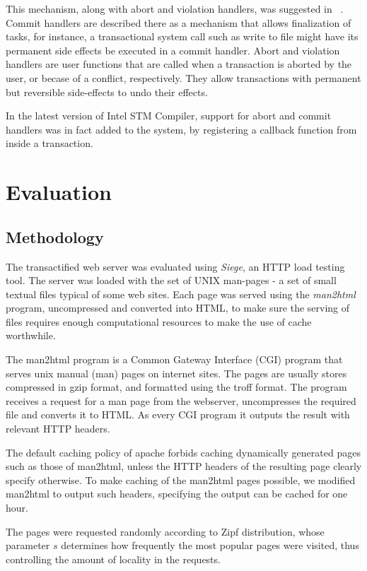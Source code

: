 \documentclass[preprint,natbib,11pt]{sigplanconf}
\begin{document}
This mechanism, along with abort and violation handlers, was suggested in
~\cite{tm:commit-handlers}.  Commit handlers are described there as a mechanism
that allows finalization of tasks, for instance, a transactional system call
such as write to file might have its permanent side effects be executed in a
commit handler. Abort and violation handlers are user functions that are called
when a transaction is aborted by the user, or becase of a conflict,
respectively. They allow transactions with permanent but reversible side-effects
to undo their effects.  

In the latest version of Intel STM Compiler, support for abort and commit
handlers was in fact added to the system, by registering a callback function
from inside a transaction.

\section{Evaluation} 
\subsection{Methodology} 
The transactified web server was evaluated using \emph{Siege}\cite{siege}, an HTTP
load testing tool. The server was loaded with the set of UNIX man-pages - a set
of small textual files typical of some web sites. Each page was served using the
\emph{man2html}\cite{man2html} program, uncompressed and converted into HTML, to make
sure the serving of files requires enough computational resources to make the
use of cache worthwhile.

The man2html program is a Common Gateway Interface (CGI) program that serves
unix manual (man) pages on internet sites. The pages are usually stores
compressed in gzip format, and formatted using the troff format. The program
receives a request for a man page from the webserver, uncompresses the required
file and converts it to HTML. As every CGI program it outputs the result with
relevant HTTP headers.

The default caching policy of apache forbids caching dynamically generated pages
such as those of man2html, unless the HTTP headers of the resulting page clearly
specify otherwise. To make caching of the man2html pages possible, we modified
man2html to output such headers, specifying the output can be cached for one
hour.

The pages were requested randomly according to Zipf distribution, whose
parameter $s$ determines how frequently the most popular pages were visited,
thus controlling the amount of locality in the requests.
\end{document}
